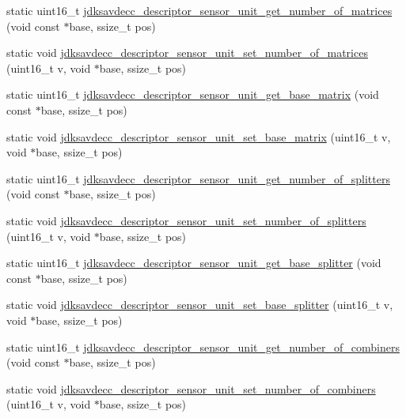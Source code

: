 \begin{DoxyCompactItemize}
\item 
static uint16\+\_\+t \hyperlink{group__descriptor__sensor_ga60e0b0d8c251cc463954dac6a84dfe90}{jdksavdecc\+\_\+descriptor\+\_\+sensor\+\_\+unit\+\_\+get\+\_\+number\+\_\+of\+\_\+matrices} (void const $\ast$base, ssize\+\_\+t pos)
\item 
static void \hyperlink{group__descriptor__sensor_ga82fcad1e4709ea82d9f3ac5ec7e653c0}{jdksavdecc\+\_\+descriptor\+\_\+sensor\+\_\+unit\+\_\+set\+\_\+number\+\_\+of\+\_\+matrices} (uint16\+\_\+t v, void $\ast$base, ssize\+\_\+t pos)
\item 
static uint16\+\_\+t \hyperlink{group__descriptor__sensor_ga19c9d0f9b8e5580d232cb817f1bb830f}{jdksavdecc\+\_\+descriptor\+\_\+sensor\+\_\+unit\+\_\+get\+\_\+base\+\_\+matrix} (void const $\ast$base, ssize\+\_\+t pos)
\item 
static void \hyperlink{group__descriptor__sensor_gaf06a1fe2ebe79ff0297cc6bdc444fb56}{jdksavdecc\+\_\+descriptor\+\_\+sensor\+\_\+unit\+\_\+set\+\_\+base\+\_\+matrix} (uint16\+\_\+t v, void $\ast$base, ssize\+\_\+t pos)
\item 
static uint16\+\_\+t \hyperlink{group__descriptor__sensor_gacf2972bedf41780f04bd0768c3f3a49f}{jdksavdecc\+\_\+descriptor\+\_\+sensor\+\_\+unit\+\_\+get\+\_\+number\+\_\+of\+\_\+splitters} (void const $\ast$base, ssize\+\_\+t pos)
\item 
static void \hyperlink{group__descriptor__sensor_ga732e1b4190ee1d05e6f9a894030982b2}{jdksavdecc\+\_\+descriptor\+\_\+sensor\+\_\+unit\+\_\+set\+\_\+number\+\_\+of\+\_\+splitters} (uint16\+\_\+t v, void $\ast$base, ssize\+\_\+t pos)
\item 
static uint16\+\_\+t \hyperlink{group__descriptor__sensor_gafe54c81caeb3bf82ad72f462f4b2d8a7}{jdksavdecc\+\_\+descriptor\+\_\+sensor\+\_\+unit\+\_\+get\+\_\+base\+\_\+splitter} (void const $\ast$base, ssize\+\_\+t pos)
\item 
static void \hyperlink{group__descriptor__sensor_ga50d9f571b2e3b8f6a42c1c031e1e49d5}{jdksavdecc\+\_\+descriptor\+\_\+sensor\+\_\+unit\+\_\+set\+\_\+base\+\_\+splitter} (uint16\+\_\+t v, void $\ast$base, ssize\+\_\+t pos)
\item 
static uint16\+\_\+t \hyperlink{group__descriptor__sensor_ga98a697927790b02616b74ca032255361}{jdksavdecc\+\_\+descriptor\+\_\+sensor\+\_\+unit\+\_\+get\+\_\+number\+\_\+of\+\_\+combiners} (void const $\ast$base, ssize\+\_\+t pos)
\item 
static void \hyperlink{group__descriptor__sensor_ga89b32eb2b01cfef0bdc677619838edb1}{jdksavdecc\+\_\+descriptor\+\_\+sensor\+\_\+unit\+\_\+set\+\_\+number\+\_\+of\+\_\+combiners} (uint16\+\_\+t v, void $\ast$base, ssize\+\_\+t pos)

\end{DoxyCompactItemize}
